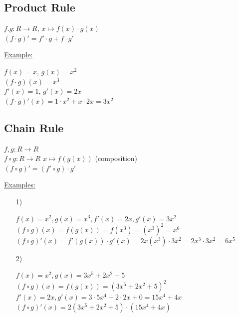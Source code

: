 \documentclass[a4paper, 12pt]{article}
\begin{document}
\subsection{Product Rule}
\begin{center}
$f.g: R \rightarrow R$, $x\mapsto f(x) \cdot g(x)$\\
$(f \cdot g)' = f' \cdot g + f \cdot g'$\\
\end{center}
\underline{Example:}
\begin{center}
$f(x) = x$, $g(x) = x^2$\\
$(f \cdot g)(x) = x^3$\\
$f'(x) = 1$, $g'(x) = 2x$\\
$(f \cdot g)'(x) = 1 \cdot x^2+x \cdot 2x = 3x^2$\\
\end{center}

\subsection{Chain Rule}
\begin{center}
$f,g : R \rightarrow R$\\
$f\circ g : R \rightarrow R$ 	$x \mapsto f(g(x))$ (composition)\\
$(f\circ g)' = (f'\circ g) \cdot g'$\\
\end{center}
\underline{Examples:}\\
\begin{enumerate}
\item[1)]
\begin{center}
$f(x) = x^2, g(x) = x^3, f'(x) = 2x, g'(x) = 3x^2$\\
$(f \circ g)(x) = f(g(x)) = f(x^3) = (x^3)^2 = x^6$\\
$(f \circ g)'(x) = f'(g(x)) \cdot g'(x) = 2x(x^3) \cdot 3x^2 = 2x^3 \cdot 3x^2 = 6x^5$\\
\end{center}
\item[2)]
\begin{center}
$f(x) = x^2,  g(x) = 3x^5 + 2x^2 +5$\\
$(f \circ g)(x) = f(g(x)) = (3x^5+2x^2+5)^2$\\
$f'(x) = 2x, g'(x)= 3 \cdot 5x^4 + 2 \cdot 2x + 0 = 15x^4 + 4x$\\
$(f \circ g)'(x) = 2(3x^5 + 2x^2 + 5)\cdot(15x^4+4x)$\\
\end{center}
\end{enumerate}
\end{document}
